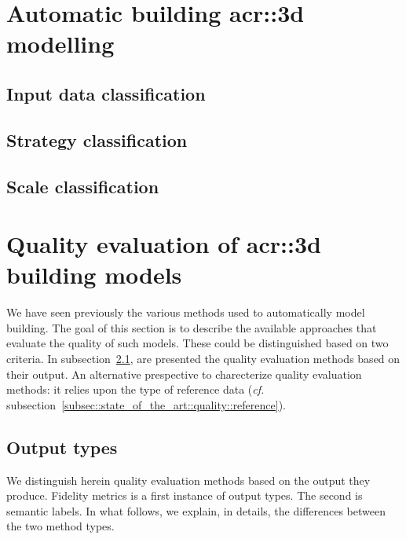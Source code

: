 \minitoc

\vfill

\clearpage

\section{Automatic building \gls*{acr::3d} modelling}
    \label{sec::state_of_the_art::building_modeling}

    \subsection{Input data classification}
        \label{subsec::state_of_the_art::building_modeling::input}

    \subsection{Strategy classification}
        \label{subsec::state_of_the_art::building_modeling::strategy}

    \subsection{Scale classification}
        \label{subsec::state_of_the_art::building_modeling::scale}

\section{Quality evaluation of \gls*{acr::3d} building models}
    \label{sec::state_of_the_art::quality}
    We have seen previously the various methods used to automatically model building.
    The goal of this section is to describe the available approaches that evaluate the quality of such models.
    These could be distinguished based on two criteria.
    In subsection~\ref{subsec::state_of_the_art::quality::output}, are presented the quality evaluation methods based on their output.
    An alternative prespective to charecterize quality evaluation methods: it relies upon the type of reference data (\textit{cf.} subsection~\ref{subsec::state_of_the_art::quality::reference}).

    \subsection{Output types}
        \label{subsec::state_of_the_art::quality::output}
        We distinguish herein quality evaluation methods based on the output they produce.
        Fidelity metrics is a first instance of output types.
        The second is semantic labels.
        In what follows, we explain, in details, the differences between the two method types.

